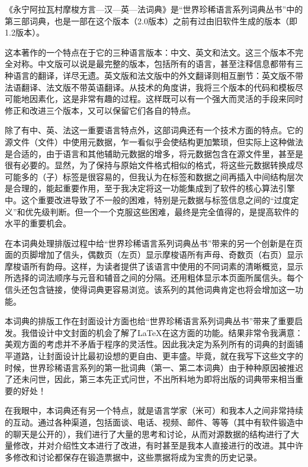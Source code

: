 《永宁阿拉瓦村摩梭方言—汉—英—法词典》是“世界珍稀语言系列词典丛书”中的第三部词典，也是一部在这个版本（2.0版本）之前有过由旧软件生成的版本（即1.2版本）。

这本著作的一个特点在于它的三种语言版本：中文、英文和法文。这三个版本不完全对称。中文版可以说是最完整的版本，包括所有的语言，甚至注释信息都带有三种语言的翻译，详尽无遗。英文版和法文版中的外文翻译则相互删节：英文版不带法语翻译、法文版不带英语翻译。从技术的角度讲，我将三个版本的代码和模板尽可能地因素化，这是非常有趣的过程。这样既可以有一个强大而灵活的手段来同时修正和改进三个版本，又可以保留它们各自的特点。

除了有中、英、法这一重要语言特点外，这部词典还有一个技术方面的特点。它的源文件（文件）中使用元数据，乍一看似乎会使结构更加繁琐，但实际上这种做法是合适的，由于语言和其他辅助元数据的增多，将元数据包含在源文件里，甚至是很有必要的。显然，为了保持与原始文件格式相似的格式，将这些元数据转换成尽可能多的（子）标签是很容易的，但我认为在标签和数据之间再插入中间结构层次是合理的，能起重要作用，至于我决定将这一功能集成到了软件的核心算法引擎中。这个重要改进导致了不一般的困难，特别是元数据与标签信息之间的“过度定义”和优先级判断。但一个一个克服这些困难，最终是完全值得的，是提高软件的水平的重要机会。

在本词典处理排版过程中给“世界珍稀语言系列词典丛书”带来的另一个创新是在页面的页脚增加了信头，偶数页（左页）显示摩梭语所有声母、奇数页（右页）显示摩梭语所有韵母。这样，为读者提供了该语言中使用的不同词素的清晰概览，显示所选择的词法顺序与元音和辅音之间的分隔。还用粗体显示本页面所属信头。每个信头还包含链接，使得词典更容易浏览。该系列的其他词典肯定也将会增加这一功能。

本词典的排版工作在封面设计方面也给“世界珍稀语言系列词典丛书”带来了重要启发。我借设计中文封面的机会了解了\LaTeX{}在这方面的功能。结果非常令我满意：美观方面的考虑并不矛盾于程序的灵活性。因此我决定为系列所有的词典的封面铺平道路，让封面设计比最初设想的更自由、更丰盛。毕竟，就在我写下这些文字的时候，世界珍稀语言系列的第一批词典（第一、第二本词典）由于种种原因被推迟了还未问世，因此，第三本先正式问世，不出所料地为即将出版的词典带来相当重要的好处！

在我眼中，本词典还有另一个特点，就是语言学家（米可）和我本人之间非常持续的互动。通过各种渠道，包括面谈、电话、视频、邮件、等等（其中有软件锻造中的聊天是公开的），我们进行了大量的思考和讨论，从而对源数据的结构进行了大量修改，并对介绍性文本进行了改进，有时甚至是我本人直接进行的改进。其中许多修改和讨论都保存在锻造票据中，这些票据将成为宝贵的历史记录。

